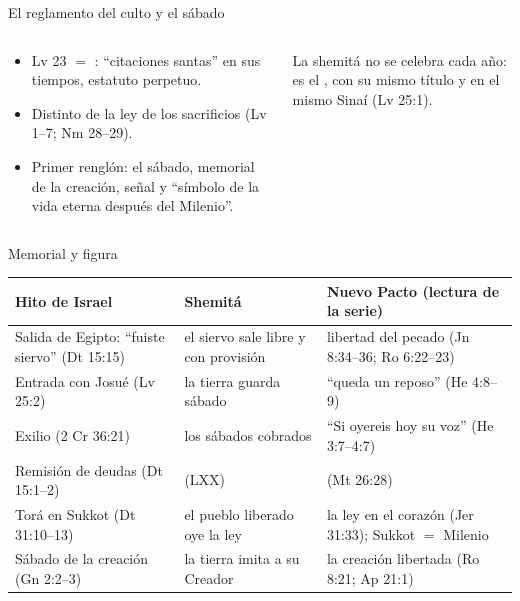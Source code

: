 \begin{frame}{El reglamento del culto y el sábado}
\begin{columns}[c,onlytextwidth]
\begin{column}{0.52\textwidth}\small
\begin{itemize}
\item Lv 23 $=$ : ``citaciones santas'' en sus tiempos, estatuto perpetuo.
\item Distinto de la ley de los sacrificios (Lv 1--7; Nm 28--29).
\item Primer renglón: el sábado, memorial de la creación, señal y ``símbolo de la vida eterna después del Milenio''.
\end{itemize}
\end{column}
\begin{column}{0.46\textwidth}
\begin{tcolorbox}[colback=papiro,colframe=tierraroja,boxrule=1pt,arc=3pt]
\small La shemitá no se celebra cada año: es el , con su mismo título y en el mismo Sinaí (Lv 25:1).
\end{tcolorbox}
\end{column}
\end{columns}
\end{frame}

\begin{frame}{Memorial y figura}
\scriptsize\renewcommand{\arraystretch}{1.16}
\begin{tabular}{@{}L{3.3cm}L{3.3cm}L{5.4cm}@{}}
\toprule
\textbf{Hito de Israel} & \textbf{Shemitá} & \textbf{Nuevo Pacto (lectura de la serie)} \\ \midrule
Salida de Egipto: ``fuiste siervo'' (Dt 15:15) & el siervo sale libre y con provisión & libertad del pecado (Jn 8:34--36; Ro 6:22--23) \\
Entrada con Josué (Lv 25:2) & la tierra guarda sábado & ``queda un reposo'' (He 4:8--9) \\
Exilio (2 Cr 36:21) & los sábados cobrados & ``Si oyereis hoy su voz'' (He 3:7--4:7) \\
Remisión de deudas (Dt 15:1--2) &  (LXX) &  (Mt 26:28) \\
Torá en Sukkot (Dt 31:10--13) & el pueblo liberado oye la ley & la ley en el corazón (Jer 31:33); Sukkot $=$ Milenio \\
Sábado de la creación (Gn 2:2--3) & la tierra imita a su Creador & la creación libertada (Ro 8:21; Ap 21:1) \\
\bottomrule
\end{tabular}\par\smallskip
{}
\end{frame}

